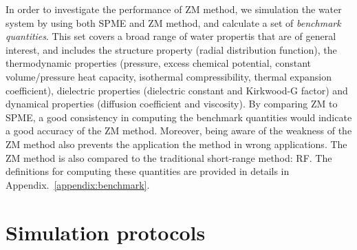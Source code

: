 \documentclass[aip,jcp,a4paper,preprint,unsortedaddress,onecolumn,fleqn]{revtex4-1}
\begin{document}
In order to investigate the performance of ZM method, we simulation
the water system by using both SPME and ZM method, and calculate a set
of \emph{benchmark quantities}.  This set covers a broad range of
water propertis that are of general interest, and includes the
structure property (radial distribution function), the thermodynamic
properties (pressure, excess chemical potential, constant
volume/pressure heat capacity, isothermal compressibility, thermal
expansion coefficient), dielectric properties (dielectric constant and
Kirkwood-G factor) and dynamical properties (diffusion coefficient and
viscosity).  By comparing ZM to SPME, a good consistency in computing
the benchmark quantities would indicate a good accuracy of the ZM
method.  Moreover, being aware of the weakness of the ZM method also
prevents the application the method in wrong applications.  The ZM
method is also compared to the traditional short-range method: RF.
The definitions for computing these quantities are provided in details
in Appendix.~\ref{appendix:benchmark}.


\section{Simulation protocols}
\end{document}
